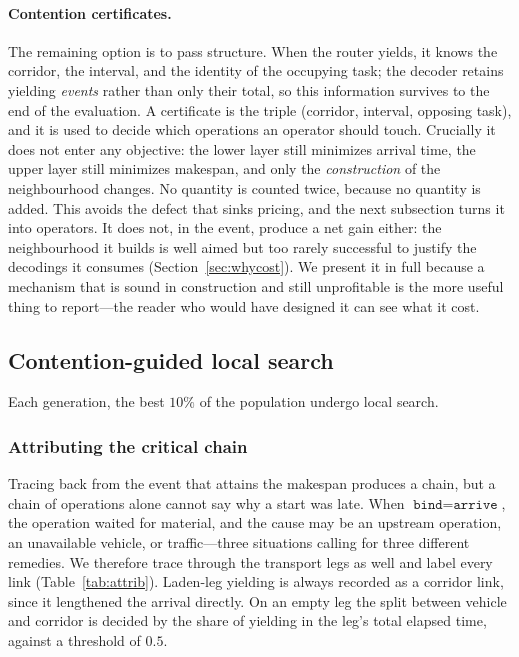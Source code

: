 \documentclass[manuscript,screen,review]{acmart}
\begin{document}
\paragraph{Contention certificates.}
The remaining option is to pass structure. When the router yields, it knows the
corridor, the interval, and the identity of the occupying task; the decoder
retains yielding \emph{events} rather than only their total, so this
information survives to the end of the evaluation. A certificate is the triple
(corridor, interval, opposing task), and it is used to decide which operations
an operator should touch. Crucially it does not enter any objective: the lower
layer still minimizes arrival time, the upper layer still minimizes makespan,
and only the \emph{construction} of the neighbourhood changes. No quantity is
counted twice, because no quantity is added. This avoids the defect that sinks
pricing, and the next subsection turns it into operators. It does not, in the
event, produce a net gain either: the neighbourhood it builds is well aimed but
too rarely successful to justify the decodings it consumes
(Section~\ref{sec:whycost}). We present it in full because a mechanism that is
sound in construction and still unprofitable is the more useful thing to
report---the reader who would have designed it can see what it cost.

\subsection{Contention-guided local search}
\label{sec:ls}

Each generation, the best $10\%$ of the population undergo local search.

\subsubsection{Attributing the critical chain}
Tracing back from the event that attains the makespan produces a chain, but a
chain of operations alone cannot say why a start was late. When
$\texttt{bind}=\texttt{arrive}$, the operation waited for material, and the
cause may be an upstream operation, an unavailable vehicle, or traffic---three
situations calling for three different remedies. We therefore trace through the
transport legs as well and label every link
(Table~\ref{tab:attrib}). Laden-leg yielding is always recorded as a corridor
link, since it lengthened the arrival directly. On an empty leg the split
between vehicle and corridor is decided by the share of yielding in the leg's
total elapsed time, against a threshold of $0.5$.
\end{document}
